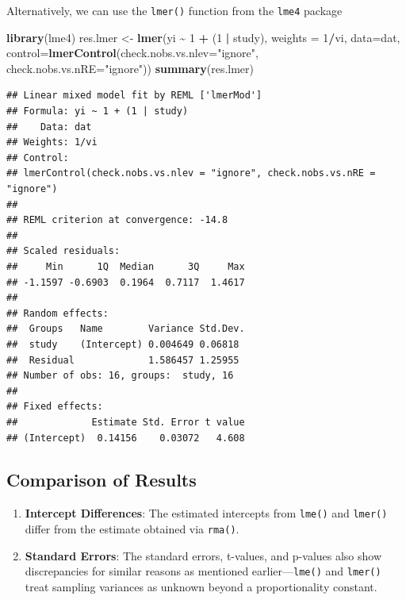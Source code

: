 \documentclass[
]{book}
\newenvironment{Shaded}{\begin{snugshade}}{\end{snugshade}}
\newcommand{\AttributeTok}[1]{\textcolor[rgb]{0.13,0.29,0.53}{#1}}
\newcommand{\DecValTok}[1]{\textcolor[rgb]{0.00,0.00,0.81}{#1}}
\newcommand{\FunctionTok}[1]{\textcolor[rgb]{0.13,0.29,0.53}{\textbf{#1}}}
\newcommand{\NormalTok}[1]{#1}
\newcommand{\OtherTok}[1]{\textcolor[rgb]{0.56,0.35,0.01}{#1}}
\newcommand{\SpecialCharTok}[1]{\textcolor[rgb]{0.81,0.36,0.00}{\textbf{#1}}}
\newcommand{\StringTok}[1]{\textcolor[rgb]{0.31,0.60,0.02}{#1}}
\begin{document}
Alternatively, we can use the \texttt{lmer()} function from the \texttt{lme4} package

\begin{Shaded}
\begin{Highlighting}[]
\FunctionTok{library}\NormalTok{(lme4)}
\NormalTok{res.lmer }\OtherTok{\textless{}{-}} \FunctionTok{lmer}\NormalTok{(yi }\SpecialCharTok{\textasciitilde{}} \DecValTok{1} \SpecialCharTok{+}\NormalTok{ (}\DecValTok{1} \SpecialCharTok{|}\NormalTok{ study), }\AttributeTok{weights =} \DecValTok{1}\SpecialCharTok{/}\NormalTok{vi, }\AttributeTok{data=}\NormalTok{dat,}
                 \AttributeTok{control=}\FunctionTok{lmerControl}\NormalTok{(}\AttributeTok{check.nobs.vs.nlev=}\StringTok{"ignore"}\NormalTok{, }\AttributeTok{check.nobs.vs.nRE=}\StringTok{"ignore"}\NormalTok{))}
\FunctionTok{summary}\NormalTok{(res.lmer)}
\end{Highlighting}
\end{Shaded}

\begin{verbatim}
## Linear mixed model fit by REML ['lmerMod']
## Formula: yi ~ 1 + (1 | study)
##    Data: dat
## Weights: 1/vi
## Control: 
## lmerControl(check.nobs.vs.nlev = "ignore", check.nobs.vs.nRE = "ignore")
## 
## REML criterion at convergence: -14.8
## 
## Scaled residuals: 
##     Min      1Q  Median      3Q     Max 
## -1.1597 -0.6903  0.1964  0.7117  1.4617 
## 
## Random effects:
##  Groups   Name        Variance Std.Dev.
##  study    (Intercept) 0.004649 0.06818 
##  Residual             1.586457 1.25955 
## Number of obs: 16, groups:  study, 16
## 
## Fixed effects:
##             Estimate Std. Error t value
## (Intercept)  0.14156    0.03072   4.608
\end{verbatim}

\subsection{Comparison of Results}\label{comparison-of-results-1}

\begin{enumerate}
\def\labelenumi{\arabic{enumi}.}
\item
  \textbf{Intercept Differences}: The estimated intercepts from \texttt{lme()} and \texttt{lmer()} differ from the estimate obtained via \texttt{rma()}.
\item
  \textbf{Standard Errors}: The standard errors, t-values, and p-values also show discrepancies for similar reasons as mentioned earlier---\texttt{lme()} and \texttt{lmer()} treat sampling variances as unknown beyond a proportionality constant.
\end{enumerate}
\end{document}

